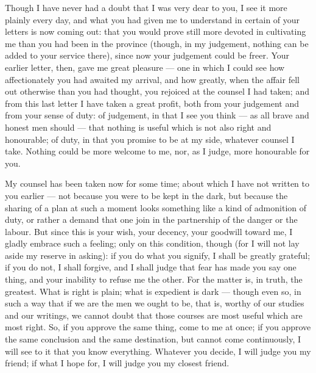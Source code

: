 

 Though I have never had a doubt that I was very dear to you, I see it more plainly every day, and what you had given me to understand in certain of your letters is now coming out: that you would prove still more devoted in cultivating me than you had been in the province (though, in my judgement, nothing can be added to your service there), since now your judgement could be freer. Your earlier letter, then, gave me great pleasure --- one in which I could see how affectionately you had awaited my arrival, and how greatly, when the affair fell out otherwise than you had thought, you rejoiced at the counsel I had taken; and from this last letter I have taken a great profit, both from your judgement and from your sense of duty: of judgement, in that I see you think --- as all brave and honest men should --- that nothing is useful which is not also right and honourable; of duty, in that you promise to be at my side, whatever counsel I take. Nothing could be more welcome to me, nor, as I judge, more honourable for you.

 My counsel has been taken now for some time; about which I have not written to you earlier --- not because you were to be kept in the dark, but because the sharing of a plan at such a moment looks something like a kind of admonition of duty, or rather a demand that one join in the partnership of the danger or the labour. But since this is your wish, your decency, your goodwill toward me, I gladly embrace such a feeling; only on this condition, though (for I will not lay aside my reserve in asking): if you do what you signify, I shall be greatly grateful; if you do not, I shall forgive, and I shall judge that fear has made you say one thing, and your inability to refuse me the other. For the matter is, in truth, the greatest. What is right is plain; what is expedient is dark --- though even so, in such a way that if we are the men we ought to be, that is, worthy of our studies and our writings, we cannot doubt that those courses are most useful which are most right. So, if you approve the same thing, come to me at once; if you approve the same conclusion and the same destination, but cannot come continuously, I will see to it that you know everything. Whatever you decide, I will judge you my friend; if what I hope for, I will judge you my closest friend.
